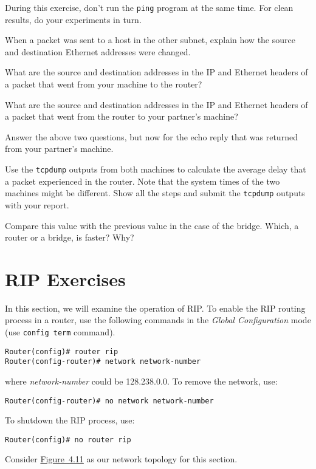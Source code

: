 \documentclass{../UTNetLab}
\begin{document}
    During this exercise, don’t run the \lstinline{ping} program at the same time.
    For clean results, do your experiments in turn.
    
    \begin{report}
    \item When a packet was sent to a host in the other subnet, explain how the source and destination Ethernet addresses were changed.
    
    \item What are the source and destination addresses in the IP and Ethernet headers of a packet that went from your machine to the router?
    
    \item What are the source and destination addresses in the IP and Ethernet headers of a packet that went from the router to your partner’s machine?
    
    \item Answer the above two questions, but now for the echo reply that was returned from your partner’s machine.

    \item Use the \lstinline{tcpdump} outputs from both machines to calculate the average delay that a packet experienced in the router.
            Note that the system times of the two machines might be different.
            Show all the steps and submit the \lstinline{tcpdump} outputs with your report.
    
    \item Compare this value with the previous value in the case of the bridge.
            Which, a router or a bridge, is faster? Why?
    \end{report}

\part{RIP Exercises}\label{sec:rip}
    In this section, we will examine the operation of RIP.
    To enable the RIP routing process in a router, use the following commands in the \textit{Global Configuration} mode (use \lstinline[language={cisco}]{config term} command).
    \begin{lstlisting}[language={cisco}, emph={network-number}]
Router(config)# router rip
Router(config-router)# network network-number
    \end{lstlisting}
    where \textit{network-number} could be 128.238.0.0.
    To remove the network, use:
    \begin{lstlisting}[language={cisco}, emph={network-number}]
Router(config-router)# no network network-number
    \end{lstlisting}
    To shutdown the RIP process, use:
    \begin{lstlisting}[language={cisco}]
Router(config)# no router rip
    \end{lstlisting}
    Consider \hyperref[fig:4.11]{Figure~4.11} as our network topology for this section.
\end{document}
